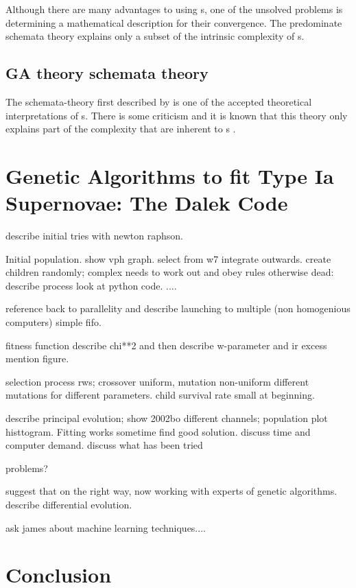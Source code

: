 Although there are many advantages to using \ga s, one of the unsolved problems is determining a mathematical description for their convergence. The predominate schemata theory explains only a subset of the intrinsic complexity of \ga s.

\subsection{GA theory schemata theory}

The schemata-theory first described by \cite{holland1975} is one of the accepted theoretical interpretations of \ga s. There is some criticism and it is known that this theory only explains part of the complexity that are inherent to \ga s \citep[see ][ and references therein]{Whitley94agenetic}. 

\section{Genetic Algorithms to fit Type Ia Supernovae: The Dalek Code}
\label{sec:geneticdalek}
describe initial tries with newton raphson. 

Initial population. show vph graph. select from w7 integrate outwards. create children randomly; complex needs to work out and obey rules otherwise dead: describe process look at python code. ....

reference back to  parallelity and describe launching to multiple (non homogenious computers) simple fifo. 

fitness function describe chi**2 and then describe w-parameter and ir excess mention figure.

selection process rws; crossover uniform, mutation non-uniform different mutations for different parameters. child survival rate small at beginning.

describe principal evolution; show 2002bo different channels; population plot histtogram.
Fitting works sometime find good solution. discuss time and computer demand. discuss what has been tried

problems?

suggest that on the right way, now working with experts of genetic algorithms. describe differential evolution. 

ask james about machine learning techniques....

\section{Conclusion}



